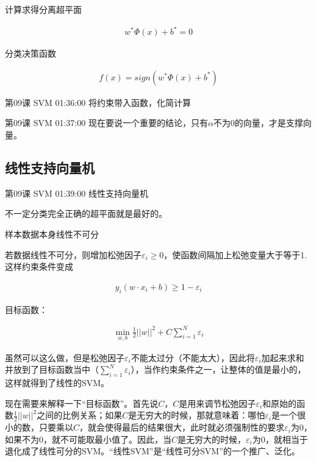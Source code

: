\documentclass[UTF8]{ctexbook}
\begin{document}
计算求得分离超平面

\begin{equation}
\begin{aligned}
w^{*}\Phi(x)+b^{*}=0
\end{aligned}
\end{equation}

分类决策函数

\begin{equation}
\begin{aligned}
f(x)=sign \left ( w^{*}\Phi(x)+b^{*} \right )
\end{aligned}
\end{equation}

第09课 SVM 01:36:00 将约束带入函数，化简计算

第09课 SVM 01:37:00 现在要说一个重要的结论，只有$\alpha$不为0的向量，才是支撑向量。

\subsection{线性支持向量机}

第09课 SVM 01:39:00 线性支持向量机

不一定分类完全正确的超平面就是最好的。

样本数据本身线性不可分

若数据线性不可分，则增加松弛因子$\varepsilon_{i} \geq 0$，使函数间隔加上松弛变量大于等于1.这样约束条件变成

\begin{equation}
\begin{aligned}
y_{i}(w \cdot x_{i}+b) \geq 1 - \varepsilon_{i}
\end{aligned}
\end{equation}

目标函数：

\begin{equation}
\begin{aligned}
\underset{w,b}{\min} \frac{1}{2} ||w||^{2} + C\sum_{i=1}^{N} \varepsilon_{i}
\end{aligned}
\end{equation}

虽然可以这么做，但是松弛因子$\varepsilon_{i}$不能太过分（不能太大），因此将$\varepsilon_{i}$加起来求和并放到了目标函数当中（$\sum_{i=1}^{N} \varepsilon_{i}$），当作约束条件之一，让整体的值是最小的，这样就得到了线性的SVM。

现在需要来解释一下“目标函数”。首先说$C$，$C$是用来调节松弛因子$\varepsilon_{i}$和原始的函数$\frac{1}{2} ||w||^{2}$之间的比例关系；如果$C$是无穷大的时候，那就意味着：哪怕$\varepsilon_{i}$是一个很小的数，只要乘以$C$，就会使得最后的结果很大，此时就必须强制性的要求$\varepsilon_{i}$为0，如果不为0，就不可能取最小值了。因此，当$C$是无穷大的时候，$\varepsilon_{i}$为0，就相当于退化成了线性可分的SVM。“线性SVM”是“线性可分SVM”的一个推广、泛化。
\end{document}
